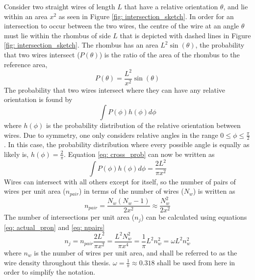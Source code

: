 Consider two straight wires of length $L$ that have a relative orientation $\theta$, and lie within an area $x^2$ as seen in Figure \ref{fig: intersection_sketch}. In order for an intersection to occur between the two wires, the centre of the wire at an angle $\theta$ must lie within the rhombus of side $L$ that is depicted with dashed lines in Figure \ref{fig: intersection_sketch}. The rhombus has an area $L^2 \sin(\theta)$, the probability that two wires intersect ($P(\theta)$) is the ratio of the area of the rhombus to the reference area,
\begin{equation}
P(\theta) = \frac{L^2}{x^2} \sin(\theta)
\label{eq: cross_prob}
\end{equation}
The probability that two wires intersect where they can have any relative orientation is found by
\begin{equation}
\int P(\phi) h(\phi) d \phi
\label{eq: cross_int}
\end{equation}
where $h(\phi)$ is the probability distribution of the relative orientation between wires. Due to symmetry, one only considers relative angles in the range $0 \leq \phi \leq \frac{\pi}{2}$. In this case, the probability distribution where every possible angle is equally as likely is, $h(\phi) = \frac{2}{\pi}$. Equation \ref{eq: cross_prob} can now be written as
\begin{equation}
\int P(\phi) h(\phi) d \phi = \frac{2 L^2}{\pi x^2}
\label{eq: actual_pron}
\end{equation}
Wires can intersect with all others except for itself, so the number of pairs of wires per unit area ($n_{pair}$) in terms of the number of wires ($N_w$) is written as 
\begin{equation}
n_{pair} = \frac{N_w (N_w - 1)}{2x^2} \approx \frac{N_w^2}{2x^2}
\label{eq: npairs}
\end{equation}
The number of intersections per unit area ($n_j$) can be calculated using equations \ref{eq: actual_pron} and \ref{eq: npairs}
\begin{equation}
n_j = n_{pair} \frac{2 L^2}{\pi x^2} = \frac{L^2 N_w^2}{\pi x^4} = \frac{1}{\pi }L^2 n_w^2 = \omega L^2 n_w^2
\label{eq:nj_nw_eqn}
\end{equation}
where $n_w$ is the number of wires per unit area, and shall be referred to as the wire density throughout this thesis. $\omega = \frac{1}{\pi} \approx 0.318 $ shall be used from here in order to simplify the notation. 

